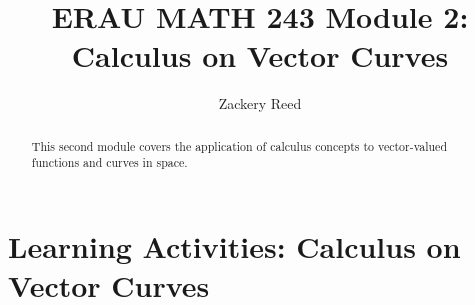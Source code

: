 \documentclass{xourse}
\title{ERAU MATH 243 Module 2: Calculus on Vector Curves}
\author{Zackery Reed}
\begin{document}
\begin{abstract}
This second module covers the application of calculus concepts to vector-valued functions and curves in space.
\end{abstract}
\maketitle

\part{Learning Activities: Calculus on Vector Curves}
\sectionstyle




\end{document}
